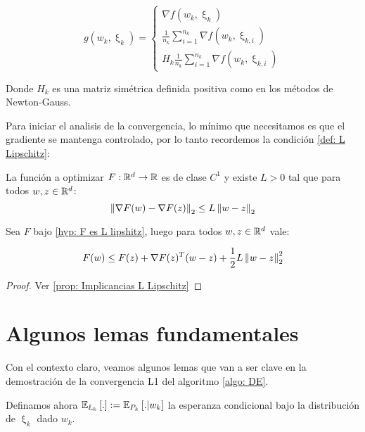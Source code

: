 \begin{equation}
g(w_k, \upxi_k) = \left\lbrace
\begin{aligned}
\nabla f(w_k, \upxi_k) \\
\frac{1}{n_k} \sum\limits_{i=1}^{n_k} {\nabla f (w_k, \upxi_{k,i})}\\
H_k\frac{1}{n_k} \sum\limits_{i=1}^{n_k} {\nabla f (w_k, \upxi_{k,i})}
\end{aligned}
\right.
\end{equation}

Donde $H_k$ es una matriz sim\'etrica definida positiva como en los m\'etodos de Newton-Gauss. 

\smallskip

Para iniciar el analisis de la convergencia, lo m\'inimo que necesitamos es que el gradiente se mantenga controlado, por lo tanto recordemos la condici\'on \ref{def: L Lipschitz}:

\begin{hyp} [$F$ es $l$-Lipshitz]
	\label{hyp: F es L lipshitz}
	La funci\'on a optimizar $F: {\mathbb{R}}^d \rightarrow {\mathbb{R}}$ es de clase $C^1$ y existe $L >0$ tal que para todos $w,z \in {\mathbb{R}}^d$:
	\begin{equation*}
	\left\lVert\nabla F(w) - \nabla F(z)\right\rVert_2 \leq L \left\lVert w-z\right\rVert_2
	\end{equation*} 
\end{hyp}

\begin{remark}
	\label{obs: F es l lipshitz}
	Sea $F$ bajo \ref{hyp: F es L lipshitz}, luego para todos $w,z\in {\mathbb{R}}^d$ vale:
	
	\begin{equation*}
	F(w) \leq F(z) + \nabla F(z)^T(w-z) + \frac{1}{2}L \left\lVert w-z\right\rVert^2_2
	\end{equation*}
	
\end{remark}

\begin{proof}
	Ver \ref{prop: Implicancias L Lipschitz}
\end{proof}

\section{Algunos lemas fundamentales}

Con el contexto claro, veamos algunos lemas que van a ser clave en la demostraci\'on de la convergencia L1 del algoritmo \ref{algo: DE}.

Definamos ahora $\mathbb{E}_{\upxi_k} \left[.\right] := \mathbb{E}_{P_k}\left[. \vert w_k\right]$ la esperanza condicional bajo la distribuci\'on de $\upxi_k$ dado $w_k$.

